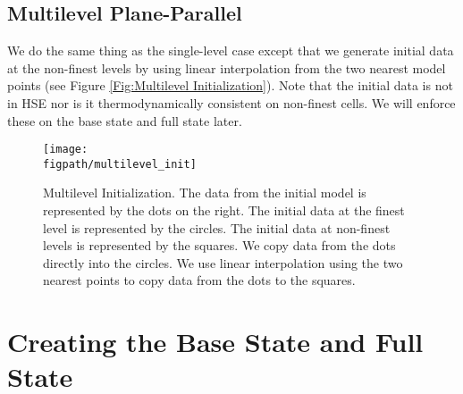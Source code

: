 \subsection{Multilevel Plane-Parallel}
We do the same thing as the single-level case except that we generate
initial data at the non-finest levels by using linear interpolation
from the two nearest model points (see Figure \ref{Fig:Multilevel
  Initialization}).  Note that the initial data is not in HSE nor is
it thermodynamically consistent on non-finest cells.  We will enforce
these on the base state and full state later.
\begin{figure}[tpb]
\centering
\texttt{[image: \\figpath/multilevel\_init]}\hspace{0.2in}
\begin{minipage}[b]{5.0in}
\caption[Multi-level initial model initialization]
 {Multilevel Initialization.  The data from the initial model
  is represented by the dots on the right.  The initial data at the
  finest level is represented by the circles.  The initial data at
  non-finest levels is represented by the squares.  We copy data from
  the dots directly into the circles.  We use linear interpolation
  using the two nearest points to copy data from the dots to the
  squares.\vspace{2em}}
\end{minipage}
\label{Fig:Multilevel Initialization}
\end{figure}


\section{Creating the Base State and Full State}\label{Sec:Creating the Base State and Full State}


